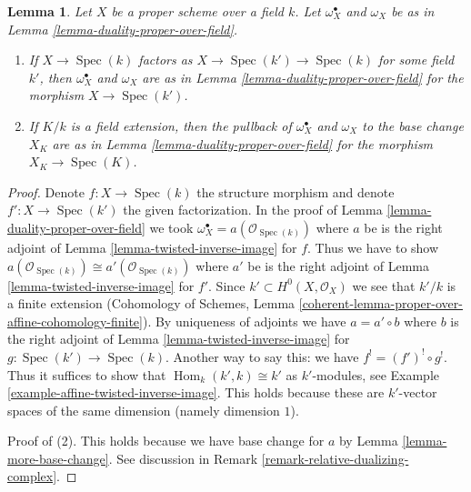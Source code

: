 \documentclass[10pt,a4paper]{amsart}
\theoremstyle{plain}
\newtheorem{lemma}[subsection]{Lemma}
\theoremstyle{definition}
\theoremstyle{remark}
\numberwithin{equation}{subsection}
\def\Spec{\mathop{\mathrm{Spec}}}
\def\Hom{\mathop{\mathrm{Hom}}\nolimits}
\begin{document}
\begin{lemma}
\label{lemma-sanity-check-duality}
Let $X$ be a proper scheme over a field $k$. Let $\omega_X^\bullet$ and
$\omega_X$ be as in Lemma \ref{lemma-duality-proper-over-field}.
\begin{enumerate}
\item If $X \to \Spec(k)$ factors as $X \to \Spec(k') \to \Spec(k)$
for some field $k'$, then $\omega_X^\bullet$ and $\omega_X$
are as in Lemma \ref{lemma-duality-proper-over-field} for the morphism
$X \to \Spec(k')$.
\item If $K/k$ is a field extension, then the pullback of
$\omega_X^\bullet$ and $\omega_X$ to the base change $X_K$
are as in  Lemma \ref{lemma-duality-proper-over-field} for the morphism
$X_K \to \Spec(K)$.
\end{enumerate}
\end{lemma}

\begin{proof}
Denote $f : X \to \Spec(k)$ the structure morphism and denote
$f' : X \to \Spec(k')$ the given factorization.
In the proof of Lemma \ref{lemma-duality-proper-over-field}
we took $\omega_X^\bullet = a(\mathcal{O}_{\Spec(k)})$
where $a$ be is the right adjoint of
Lemma \ref{lemma-twisted-inverse-image} for $f$.
Thus we have to show
$a(\mathcal{O}_{\Spec(k)}) \cong a'(\mathcal{O}_{\Spec(k)})$
where $a'$ be is the right adjoint of
Lemma \ref{lemma-twisted-inverse-image} for $f'$.
Since $k' \subset H^0(X, \mathcal{O}_X)$ we see that $k'/k$ is a finite
extension (Cohomology of Schemes, Lemma
\ref{coherent-lemma-proper-over-affine-cohomology-finite}).
By uniqueness of adjoints we have $a = a' \circ b$ where
$b$ is the right adjoint of Lemma
\ref{lemma-twisted-inverse-image} for $g : \Spec(k') \to \Spec(k)$.
Another way to say this: we have $f^! = (f')^! \circ g^!$.
Thus it suffices to show that $\Hom_k(k', k) \cong k'$ as
$k'$-modules, see Example \ref{example-affine-twisted-inverse-image}.
This holds because these are $k'$-vector spaces of
the same dimension (namely dimension $1$).

\medskip\noindent
Proof of (2). This holds because we have base change for $a$ by
Lemma \ref{lemma-more-base-change}. See discussion in
Remark \ref{remark-relative-dualizing-complex}.
\end{proof}
\end{document}
